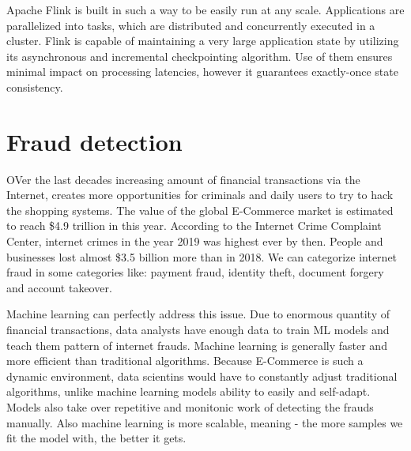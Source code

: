 Apache Flink is built in such a way to be easily run at any scale. Applications are parallelized into tasks,
which are distributed and concurrently executed in a cluster.
Flink is capable of maintaining a very large application state by utilizing its asynchronous and incremental checkpointing algorithm.
Use of them ensures minimal impact on processing latencies, however it guarantees exactly-once state consistency.\cite{flink}

\section{Fraud detection}

OVer the last decades increasing amount of financial transactions via the Internet, creates more opportunities for
criminals and daily users to try to hack the shopping systems.
The value of the global E-Commerce market is estimated to reach \$4.9 trillion in this year.
According to the Internet Crime Complaint Center, internet crimes in the year 2019 was highest ever by then.
People and businesses lost almost \$3.5 billion more than in 2018. We can categorize internet fraud
in some categories like: payment fraud, identity theft, document forgery and account takeover.

Machine learning can perfectly address this issue. Due to enormous quantity of financial transactions,
data analysts  have enough data to train ML models and teach them pattern of internet frauds.
Machine learning is generally faster and more efficient than traditional algorithms.
Because E-Commerce is such a dynamic environment, data scientins would have to constantly adjust traditional
algorithms, unlike machine learning models ability to easily and self-adapt.
Models also take over repetitive and monitonic work of detecting the frauds manually.
Also machine learning is more scalable, meaning - the more samples we fit the model with, the better it gets.\cite{frauds}
